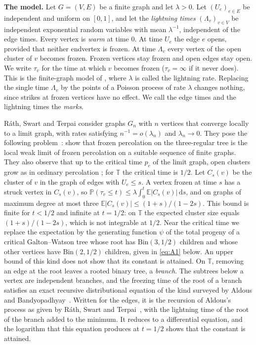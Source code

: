 \documentclass[11pt]{amsart}
\theoremstyle{remark}
\numberwithin{equation}{section}
\newcommand{\T}{\mathbb{T}}
\newcommand{\PP}{\mathbb{P}}
\newcommand{\E}{\mathbb{E}}
\newcommand{\dd}{\mathrm{d}}
\begin{document}
\smallskip
\noindent\textbf{The model.} Let $G=(V,E)$ be a finite graph and let
$\lambda>0$. Let $(U_e)_{e\in E}$ be independent and uniform on $[0,1]$,
and let the \emph{lightning times} $(\Lambda_v)_{v\in V}$ be independent exponential random variables
with mean $\lambda^{-1}$, independent of the edge times. Every vertex is
\emph{warm} at time $0$. At time $U_e$ the edge $e$ opens, provided that
neither endvertex is frozen. At time $\Lambda_v$ every vertex of the open
cluster of $v$ becomes frozen. Frozen vertices stay frozen and open edges
stay open. We write $\tau_v$ for the time at which $v$ becomes frozen
($\tau_v=\infty$ if it never does). This is the finite-graph model of
\cite[Section~1.7]{RST21}, where $\lambda$ is called the lightning rate.
Replacing the single time $\Lambda_v$ by the points of a Poisson process
of rate $\lambda$ changes nothing, since strikes at frozen vertices have
no effect. We call the edge times and the lightning times the \emph{marks}.

Ráth, Swart and Terpai consider graphs $G_n$ with $n$ vertices that
converge locally to a limit graph, with rates satisfying
$n^{-1}=o(\lambda_n)$ and $\lambda_n\to0$. They pose the following
problem~\cite[Problem~2]{RST21}: show that frozen percolation on the
three-regular tree is the local weak limit of frozen percolation on a
suitable sequence of finite graphs. They also observe
that up to the critical time $p_c$ of the limit graph, open clusters
grow as in ordinary percolation \cite[Section~1.7]{RST21}; for $\T$ the
critical time is $1/2$. Let $C_s(v)$ be the cluster of $v$ in the graph
of edges with $U_e\le s$. A vertex frozen at time $s$ has a struck vertex
in $C_s(v)$, so $\PP(\tau_v\le t)\le\lambda\int_0^t\E|C_s(v)|\,\dd s$,
and on graphs of maximum degree at most three
$\E|C_s(v)|\le(1+s)/(1-2s)$. This bound is finite for $t<1/2$ and
infinite at $t=1/2$: on $\T$ the expected cluster size equals
$(1+s)/(1-2s)$, which is not integrable at $1/2$. Near the critical time
we replace the expectation by the generating function $\psi$ of
the total progeny of a critical Galton--Watson tree whose root has
$\mathrm{Bin}(3,1/2)$ children and whose other vertices have
$\mathrm{Bin}(2,1/2)$ children, given in
\eqref{eq:A1} below. An upper bound of this kind does not show that its
constant is attained. On $\T$, removing an edge at the root leaves a
rooted binary tree, a \emph{branch}. The subtrees below a vertex are
independent branches, and the freezing time of the root of a branch
satisfies an exact recursive distributional equation of the kind
surveyed by Aldous and Bandyopadhyay~\cite{AB05}. Written for the
edges, it is the recursion of Aldous's process as given by Ráth, Swart
and Terpai~\cite[Section~1.2]{RST21}, with the lightning time of the root
of the branch added to the minimum. It reduces to a
differential equation, and the logarithm that this equation produces at
$t=1/2$ shows that the constant is attained.
\end{document}
